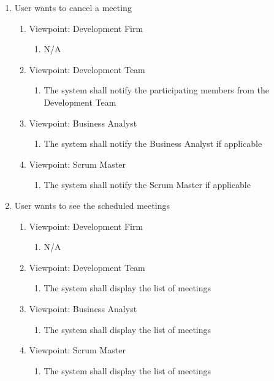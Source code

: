 \documentclass[12pt, titlepage]{article}
\begin{document}
\begin{enumerate}[{BE}1.]
	\item User wants to cancel a meeting %
	\begin{enumerate}[{VP}1.] 
	    \item Viewpoint: Development Firm
	        \begin{enumerate}
	            \item[] N/A
	        \end{enumerate}
	    \item Viewpoint: Development Team
	        \begin{enumerate}
	            \item The system shall notify the participating members from the Development Team
	        \end{enumerate}
		\item Viewpoint: Business Analyst
			\begin{enumerate}
	            \item The system shall notify the Business Analyst if applicable
			\end{enumerate}
		\item Viewpoint: Scrum Master
			\begin{enumerate}
	            \item The system shall notify the Scrum Master if applicable
			\end{enumerate}
	\end{enumerate}
	
	\item User wants to see the scheduled meetings
	\begin{enumerate}[{VP}1.] 
	    \item Viewpoint: Development Firm
	        \begin{enumerate}
	            \item[] N/A
	        \end{enumerate}
	    \item Viewpoint: Development Team
	        \begin{enumerate}
	            \item The system shall display the list of meetings
	        \end{enumerate}
		\item Viewpoint: Business Analyst
			\begin{enumerate}
	            \item The system shall display the list of meetings
			\end{enumerate}
		\item Viewpoint: Scrum Master
			\begin{enumerate}
	            \item The system shall display the list of meetings
			\end{enumerate}
	\end{enumerate}
	

\end{enumerate}
\end{document}
